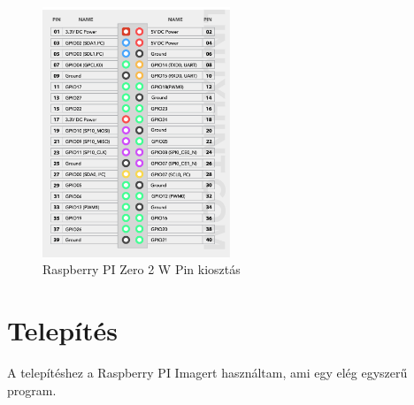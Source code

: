\documentclass[a4paper,12pt,oneside]{report}
\begin{document}
\begin{itemize}
	\begin{figure}[htbp]
		\centering
		\includegraphics[width=0.5\textwidth]{fig/gpio.png}
		\caption{Raspberry PI Zero 2 W Pin kiosztás}
		\label{fig-gpio}
	\end{figure}
		
	\end{itemize}









\chapter{Telepítés}

A telepítéshez a Raspberry PI Imagert használtam, ami egy elég egyszerű program.
\end{document}
